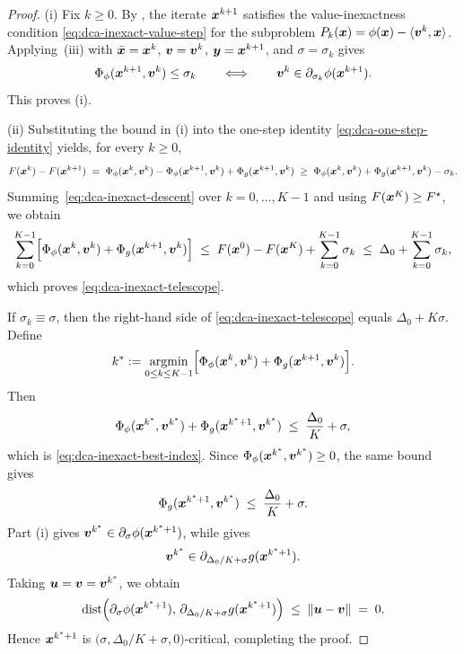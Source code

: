 \documentclass[english]{article}
\begin{document}
\begin{proof}
(i) Fix $k\ge0$. By , the iterate
$\bm{x}^{k+1}$ satisfies the value-inexactness condition
\eqref{eq:dca-inexact-value-step} for the subproblem
$P_k(\bm{x})=\phi(\bm{x})-\langle\bm{v}^k,\bm{x}\rangle$. Applying
\,(iii) with
$\bar{\bm{x}}=\bm{x}^k$, $\bm{v}=\bm{v}^k$, $\bm{y}=\bm{x}^{k+1}$, and
$\sigma=\sigma_k$ gives
\[
    \Phi_\phi(\bm{x}^{k+1},\bm{v}^k)\le\sigma_k
    \qquad\Longleftrightarrow\qquad
    \bm{v}^k\in\partial_{\sigma_k}\phi(\bm{x}^{k+1}).
\]
This proves (i).

(ii) Substituting the bound in (i) into the one-step identity
\eqref{eq:dca-one-step-identity} yields, for every $k\ge0$,
\begin{equation}
    F(\bm{x}^k)-F(\bm{x}^{k+1})
    \;=\;
    \Phi_\phi(\bm{x}^k,\bm{v}^k)
    -\Phi_\phi(\bm{x}^{k+1},\bm{v}^k)
    +\Phi_g(\bm{x}^{k+1},\bm{v}^k)
    \;\ge\;
    \Phi_\phi(\bm{x}^k,\bm{v}^k)
    +\Phi_g(\bm{x}^{k+1},\bm{v}^k)
    -\sigma_k .
    \label{eq:dca-inexact-descent}
\end{equation}
Summing~\eqref{eq:dca-inexact-descent} over $k=0,\ldots,K-1$
and using $F(\bm{x}^K)\ge F^\star$, we obtain
\[
    \sum_{k=0}^{K-1}
    \Bigl[
        \Phi_\phi(\bm{x}^k,\bm{v}^k)+\Phi_g(\bm{x}^{k+1},\bm{v}^k)
    \Bigr]
    \;\le\;
    F(\bm{x}^0)-F(\bm{x}^K)+\sum_{k=0}^{K-1}\sigma_k
    \;\le\;
    \Delta_0+\sum_{k=0}^{K-1}\sigma_k,
\]
which proves \eqref{eq:dca-inexact-telescope}.

If $\sigma_k\equiv\sigma$, then the right-hand side of
\eqref{eq:dca-inexact-telescope} equals $\Delta_0+K\sigma$. Define
\[
    k^*
    :=
    \operatorname*{\mathrm{argmin}}_{0\le k\le K-1}
    \Bigl[
        \Phi_\phi(\bm{x}^k,\bm{v}^k)+\Phi_g(\bm{x}^{k+1},\bm{v}^k)
    \Bigr].
\]
Then
\[
    \Phi_\phi(\bm{x}^{k^*},\bm{v}^{k^*})
    +\Phi_g(\bm{x}^{k^*+1},\bm{v}^{k^*})
    \;\le\;
    \frac{\Delta_0}{K}+\sigma,
\]
which is \eqref{eq:dca-inexact-best-index}. Since
$\Phi_\phi(\bm{x}^{k^*},\bm{v}^{k^*})\ge0$, the same bound gives
\[
    \Phi_g(\bm{x}^{k^*+1},\bm{v}^{k^*})
    \;\le\;
    \frac{\Delta_0}{K}+\sigma .
\]
Part (i) gives
$\bm{v}^{k^*}\in\partial_\sigma\phi(\bm{x}^{k^*+1})$, while
 gives
\[
    \bm{v}^{k^*}\in
    \partial_{\Delta_0/K+\sigma}g(\bm{x}^{k^*+1}).
\]
Taking $\bm{u}=\bm{v}=\bm{v}^{k^*}$, we obtain
\[
    \operatorname{dist}
    \Bigl(
        \partial_{\sigma}\phi(\bm{x}^{k^*+1}),\,
        \partial_{\Delta_0/K+\sigma}g(\bm{x}^{k^*+1})
    \Bigr)
    \;\le\;
    \|\bm{u}-\bm{v}\|
    \;=\;
    0.
\]
Hence $\bm{x}^{k^*+1}$ is
$\bigl(\sigma,\Delta_0/K+\sigma,0\bigr)$-critical, completing the proof.
\end{proof}
\end{document}
